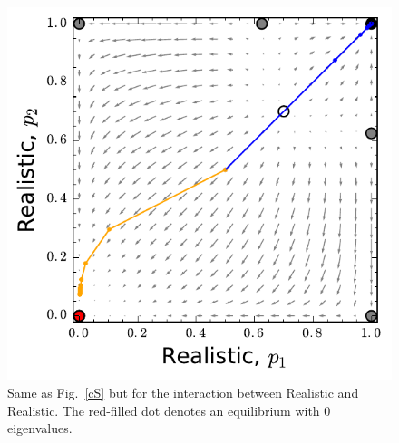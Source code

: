 \documentclass[11pt,reqno]{amsart}
\newcommand{\om}{o}
\begin{document}
\begin{figure}
\begin{center}
\includegraphics[scale=0.6]{DSrr.pdf}
\caption{Same as Fig.~\ref{cS} but for the interaction between Realistic and Realistic. The red-filled dot denotes an equilibrium with 0 eigenvalues.}
\label{dspr}
\end{center}
\end{figure}



%

%
%
%
\end{document}
